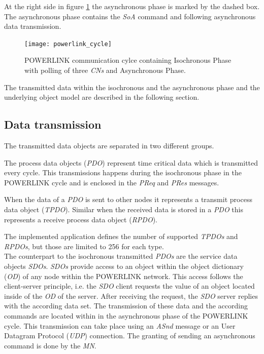 At the right side in figure \ref{fig:powerlink_cycle} the asynchronous phase is marked by the dashed box.
The asynchronous phase contains the \emph{SoA} command  and following asynchronous data transmission.

\begin{figure}
    \centering
    \texttt{[image: powerlink\_cycle]}
    \caption{POWERLINK communication cylce containing Isochronous Phase with polling of three \emph{CNs} and Asynchronous Phase.}
    \label{fig:powerlink_cycle}
\end{figure}

The transmitted data within the isochronous and the asynchronous phase and the underlying object model are described in the following section.

\subsection{Data transmission}
\label{sec:oplk_powerlink_data_transmission}
The transmitted data objects are separated in two different groups.

\begin{sloppypar}
The process data objects (\emph{PDO}) represent time critical data which is transmitted every cycle.
This transmissions happens during the isochronous phase in the POWERLINK cycle and is enclosed in the \emph{PReq} and \emph{PRes} messages.
\end{sloppypar}

When the data of a \emph{PDO} is sent to other nodes it represents a transmit process data object (\emph{TPDO}).
Similar when the received data is stored in a \emph{PDO} this represents a receive process data object (\emph{RPDO}).

The implemented application defines the number of supported \emph{TPDOs} and \emph{RPDOs}, but those are limited to 256 for each type. \cite[section 6.4]{epsg_epsg_2013}
\\

The counterpart to the isochronous transmitted \emph{PDOs} are the service data objects \emph{SDOs}.
\emph{SDOs} provide access to an object within the object dictionary (\emph{OD}) of any node within the POWERLINK network.
This access follows the client-server principle, i.e. the \emph{SDO} client requests the value of an object located inside of the  \emph{OD} of the server.
After receiving the request, the \emph{SDO} server replies with the according data set.
The transmission of these data and the according commands are located within in the asynchronous phase of the POWERLINK cycle.
This transmission can take place using an \emph{ASnd} message or an User Datagram Protocol (\emph{UDP}) connection.
The granting of sending an asynchronous command is done by the \emph{MN}.

